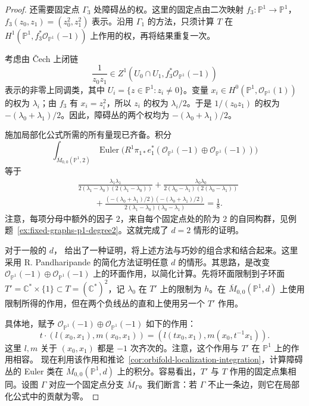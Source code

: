 \begin{proof}
还需要固定点 $\Gamma_3$ 处障碍丛的权。这里的固定点由二次映射 $f_3:\mathbb P^1\to\mathbb P^1$，$f_3(z_0,z_1)=(z_0^2,z_1^2)$ 表示。沿用 $\Gamma_1$ 的方法，只须计算 $T$ 在 $H^1(\mathbb P^1,f_3^*\mathcal O_{\mathbb P^1}(-1))$ 上作用的权，再将结果重复一次。

考虑由 Čech 上闭链
\[
\frac1{z_0z_1}\in Z^1(U_0\cap U_1,f_3^*\mathcal O_{\mathbb P^1}(-1))
\]
表示的非零上同调类，其中 $U_i=\{z\in\mathbb P^1:z_i\ne0\}$。变量 $x_i\in H^0(\mathbb P^1,\mathcal O_{\mathbb P^1}(1))$ 的权为 $\lambda_i$；由 $f_3$ 有 $x_i=z_i^2$，所以 $z_i$ 的权为 $\lambda_i/2$。于是 $1/(z_0z_1)$ 的权为 $-(\lambda_0+\lambda_1)/2$。因此，障碍丛的两个权均为 $-(\lambda_0+\lambda_1)/2$。

施加局部化公式所需的所有量现已齐备。积分
\[
\int_{\overline M_{0,0}(\mathbb P^1,2)}\operatorname{Euler}
\bigl(R^1\pi_{1*}e_1^*(\mathcal O_{\mathbb P^1}(-1)\oplus\mathcal O_{\mathbb P^1}(-1))\bigr)
\]
等于
\begin{align*}
&\frac{\lambda_1\lambda_1}{2(\lambda_1-\lambda_0)(2(\lambda_1-\lambda_0))}
+\frac{\lambda_0\lambda_0}{2(\lambda_0-\lambda_1)(2(\lambda_0-\lambda_1))}\\
&\qquad+\frac{(- (\lambda_0+\lambda_1)/2)(-(\lambda_0+\lambda_1)/2)}
{2(\lambda_1-\lambda_0)(\lambda_0-\lambda_1)}=\frac18.
\end{align*}
注意，每项分母中额外的因子 $2$，来自每个固定点处的阶为 $2$ 的自同构群，见例题~\ref{ex:fixed-graphs-p1-degree2}。这就完成了 $d=2$ 情形的证明。

对于一般的 $d$， 给出了一种证明，将上述方法与巧妙的组合求和结合起来。这里采用 R. Pandharipande 的简化方法证明任意 $d$ 的情形。其思路，是改变 $\mathcal O_{\mathbb P^1}(-1)\oplus\mathcal O_{\mathbb P^1}(-1)$ 上的环面作用，以简化计算。先将环面限制到子环面 $T'=\mathbb C^*\times\{1\}\subset T=(\mathbb C^*)^2$，记 $\lambda_0$ 在 $T'$ 上的限制为 $h$。在 $\overline M_{0,0}(\mathbb P^1,d)$ 上使用限制所得的作用，但在两个负线丛的直和上使用另一个 $T'$ 作用。

具体地，赋予 $\mathcal O_{\mathbb P^1}(-1)\oplus\mathcal O_{\mathbb P^1}(-1)$ 如下的作用：
\[
t\cdot(l(x_0,x_1),m(x_0,x_1))=(l(tx_0,x_1),m(x_0,t^{-1}x_1)).
\]
这里 $l,m$ 关于 $(x_0,x_1)$ 都是 $-1$ 次齐次的。注意，这个作用与 $T'$ 在 $\mathbb P^1$ 上的作用相容。
现在利用该作用和推论~\ref{cor:orbifold-localization-integration}，计算障碍丛的 Euler 类在 $\overline M_{0,0}(\mathbb P^1,d)$ 上的积分。容易看出，$T'$ 与 $T$ 作用的固定点集相同。设图 $\Gamma$ 对应一个固定点分支 $\overline M_\Gamma$。我们断言：若 $\Gamma$ 不止一条边，则它在局部化公式中的贡献为零。


\end{proof}
